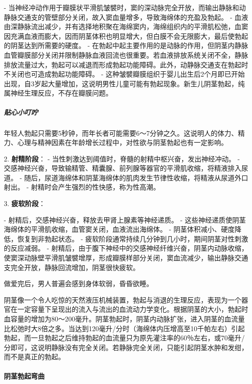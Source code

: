    - 当神经冲动作用于瓣膜状平滑肌皱襞时，窦的深动脉完全开放，而输出静脉和动静脉交通支的管壁部分关闭，故入窦血量增多，导致海绵体的充盈及勃起。
   - 血液由深静脉流出减少，并有选择地积聚在海绵窦内，海绵组织内的平滑肌松弛，血窦因充满血液而膨大，因而阴茎体积也明显增大，但白膜不会无限膨大，最后使勃起的阴茎达到所需要的硬度。
   - 在勃起中起主要作用的是动脉的作用，但阴茎内静脉血管瓣膜部分关闭并限制静脉血液回流也很重要。若血液排放系统关闭不全，静脉排放流量过大，勃起可以减退而形成勃起功能障碍。此外，动静脉交通支在勃起时不关闭也可造成勃起功能障碍。
   - 这种皱襞瓣膜组织于婴儿出生后2个月即已开始出现，自3岁起大量增加，这说明男性儿童可能有勃起现象。新生儿阴茎勃起，纯属神经生理反应，不存在瓣膜问题。

\subparagraph{贴心小叮咛}

年轻人勃起只需要5秒钟，而年长者可能需要6～7分钟之久。这说明人的体力、精力、心理与精神因素在年龄增长过程中，对性欲与阴茎勃起也有一定影响。

2. \textbf{射精阶段}：
   - 当性刺激达到阈值时，脊髓的射精中枢兴奋，发出神经冲动。
   - 交感神经兴奋，导致输精管、精囊腺、前列腺等器官的平滑肌收缩，将精液排入尿道。
   - 随后，尿道海绵体和阴茎海绵体的肌肉发生节律性收缩，将精液从尿道外口射出。
   - 射精时会产生强烈的性快感，称为性高潮。

3. \textbf{疲软阶段}：
   
   - 射精后，交感神经兴奋，释放去甲肾上腺素等神经递质。
   - 这些神经递质使阴茎海绵体的平滑肌收缩，血管窦关闭，血液流出海绵体。
   - 阴茎体积减小、硬度降低，恢复到非勃起状态。
   - 疲软阶段通常持续几分钟到几小时，期间阴茎对性刺激的反应减弱。
   - 射精后，由于腹下神经中的交感神经纤维兴奋，阴茎内动脉收缩，使窦深动脉壁平滑肌皱襞增厚，形成瓣膜样部分关闭，窦血流减少，输出静脉交通支完全开放，静脉回流增加，阴茎很快疲软。

做爱完后，男人普遍会感到身体软弱，昏昏欲睡。

阴茎像一个令人吃惊的天然液压机械装置，勃起与消退的生理反应，表现为一个器官在一定容量下呈现出的流入与流出的血流动力学变化。根据阴茎的大小，勃起时血容量的增加为80～200毫升。阴茎勃起时，阴茎内动脉扩张，进入阴茎的血流量比松弛时大8倍之多。当达到120毫升/分时（海绵体内压增高至10千帕左右）引起勃起，而一旦勃起之后维持勃起的血流量只为原先灌注率的60％左右，或70毫升/分即可，这说明静脉没有完全关闭。若静脉完全关闭，只能引起阴茎水肿和发绀，而不是真正的勃起。

\paragraph{阴茎勃起弯曲}

